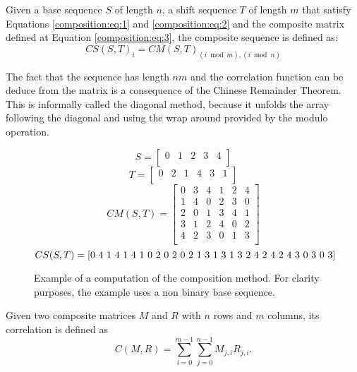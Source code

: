 \begin{definition}
  Given a base sequence $S$ of length $n$, a shift sequence $T$ of
  length $m$ that satisfy Equations \eqref{composition:eq:1} and
  \eqref{composition:eq:2} and the composite matrix defined at Equation
  \eqref{composition:eq:3}, the composite sequence is defined as:
  \begin{equation}
    CS(S, T)_{i} = CM(S, T)_{(i \bmod m), (i \bmod n)}
  \end{equation}
\end{definition}
The fact that the sequence has length $nm$ and the correlation function can be deduce from the matrix is a consequence of the Chinese Remainder Theorem.  This is informally called the diagonal method, because it unfolds the array following the diagonal and using the wrap around provided by the modulo operation.
\begin{figure}[ht!]
  $$S = \begin{bmatrix}
    0 & 1 & 2 & 3 & 4\\
  \end{bmatrix}$$
  $$T = \begin{bmatrix}
    0 & 2 & 1 & 4 & 3 & 1\\
  \end{bmatrix}
  $$
  $$CM(S, T) = \begin{bmatrix}
  0 & 3 & 4 & 1 & 2 & 4\\
  1 & 4 & 0 & 2 & 3 & 0\\
  2 & 0 & 1 & 3 & 4 & 1\\
  3 & 1 & 2 & 4 & 0 & 2\\
  4 & 2 & 3 & 0 & 1 & 3\\
  \end{bmatrix}
  $$
  $$CS(S, T) = \text{[0 4 1 4 1 4 1 0 2 0 2 0 2 1 3 1 3 1 3 2 4 2 4 2 4 3 0 3 0 3]}\\
  $$
  \caption{Example of a computation of the composition method. For clarity purposes, the example uses a non binary base sequence.}
  \label{}
\end{figure}

\begin{definition}
  Given two composite matrices $M$ and $R$ with $n$ rows and $m$ columns,
  its correlation is defined as
  \begin{equation}
    C(M, R) = \sum_{i=0}^{m-1}\sum_{j=0}^{n-1}M_{j, i}R_{j,i}.
  \end{equation}
\end{definition}

